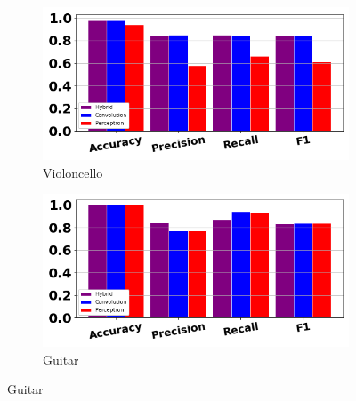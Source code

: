 \documentclass[12pt,letterpaper]{article}
\begin{document}
\begin{figure}[H]
	\begin{subfigure}[b]{0.45\textwidth}
	\centering
	\includegraphics[width=\textwidth]{../FiguresClasses/Cello}
	\caption{Violoncello}
	\end{subfigure}	
	\hfill
	\begin{subfigure}[b]{0.45\textwidth}
	\centering
	\includegraphics[width=\textwidth]{../FiguresClasses/Guitar}
	\caption{Guitar}
	\end{subfigure}	
	

\end{figure}
\end{document}
